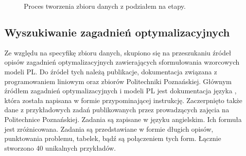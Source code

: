 \begin{figure}[H]
\caption{Proces tworzenia zbioru danych z podziałem na etapy.}
\label{fig:dataset-creation-logical}
\end{figure}



\subsection{Wyszukiwanie zagadnień optymalizacyjnych}


Ze względu na specyfikę zbioru danych, skupiono się na przeszukaniu źródeł opisów zagadnień optymalizacyjnych zawierających sformułowania wzorcowych modeli PL.
Do źródeł tych należą publikacje, dokumentacja związana z programowaniem liniowym\cite{brilliant_linear,byjus_linear,cimt,arsdcollege2020,libretexts_linear,superprof_linear,toppr_graphical} oraz zbiorów Politechniki Poznańskiej. %
Głównym źródłem zagadnień optymalizacyjnych i modeli PL jest dokumentacja języka   \cite{zimpl_manual}, która została napisana w formie przypominającej instrukcję. Zaczerpnięto także dane z przykładowych zadań publikowanych przez prowadzących zajęcia na Politechnice Poznańskiej. Zadania są zapisane w języku angielskim. Ich formuła jest zróżnicowana. Zadania są przedstawiane w formie długich opisów, punktowania problemu, tabelek, bądź są połączeniem tych form. Łącznie stworzono 40 unikalnych przykładów.



